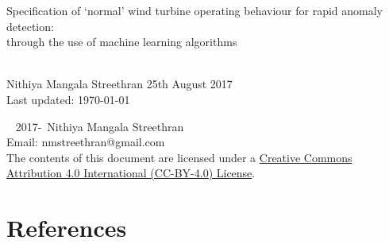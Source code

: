 \documentclass[twoside,12pt,openany]{book}
\def\theauthor{Nithiya Mangala Streethran}
\def\thetitle{%
  Specification of \texorpdfstring{`}{'}normal' wind turbine operating
  behaviour for rapid anomaly detection:\texorpdfstring{\\}{}
  through the use of machine learning algorithms%
}
\begin{document}
\thefrontmatter

\begin{titlepage}
  \hspace{0pt}\vfill %
  \centering %
  \Large\thetitle
  \\[4cm]
  \large\theauthor
  \vfill
  25th August 2017
  \\[.5cm]
  Last updated: \today
  \vfill\hspace{0pt} %
\end{titlepage}

\onehalfspacing

\hspace{0pt}\vfill
\noindent\textcopyright~ 2017-\the\year{}~\theauthor \\[.5cm]
\noindent Email: nmstreethran@gmail.com \\[.5cm]
\noindent The contents of this document are licensed under a
\href{https://creativecommons.org/licenses/by/4.0/}%
{Creative Commons Attribution 4.0 International (CC-BY-4.0) License}.
\vfill\hspace{0pt}



\contentlists

\themainmatter







{%
  \backmatter%
  \chapter{References}%
  \printbibliography[heading=none]%
}

\theappendix


\end{document}
